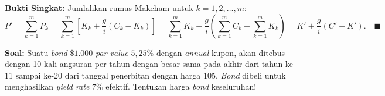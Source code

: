 \documentclass[11pt,a4paper]{article}
\begin{document}
\noindent\textbf{Bukti Singkat:}
Jumlahkan rumus Makeham untuk $k = 1, 2, \dots, m$:
\[
    P' = \sum_{k=1}^m P_k = \sum_{k=1}^m \left[K_k + \frac{g}{i}(C_k - K_k)\right] = \sum_{k=1}^m K_k + \frac{g}{i}\left(\sum_{k=1}^m C_k - \sum_{k=1}^m K_k\right) = K' + \frac{g}{i}(C' - K'). \quad \blacksquare
\]

\begin{examplebox}
\textbf{Soal:} Suatu \textit{bond} $\$1.000$ \textit{par value} $5{,}25\%$ dengan \textit{annual} kupon, akan ditebus dengan 10 kali angsuran per tahun dengan besar sama pada akhir dari tahun ke-11 sampai ke-20 dari tanggal penerbitan dengan harga $105$. \textit{Bond} dibeli untuk menghasilkan \textit{yield rate} $7\%$ efektif. Tentukan harga \textit{bond} keseluruhan!


\end{examplebox}
\end{document}
